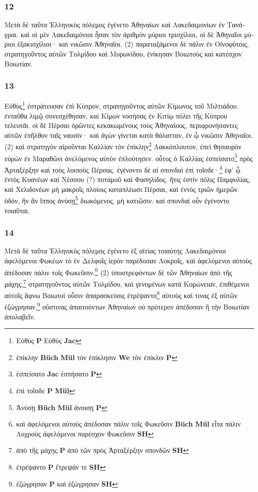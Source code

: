 \subsubsection*{12} \textgreek{Μετὰ δὲ ταῦτα Ἑλληνικὸς πόλεμος ἐγένετο Ἀθηναίων καὶ Λακεδαιμονίων ἐν Τανάγραι. καὶ οἱ μὲν Λακεδαιμόνιοι ἦσαν τὸν ἀριθμὸν μύριοι τρισχίλιοι, οἱ δὲ Ἀθηναῖοι μύριοι ἑξακισχίλιοι· καὶ νικῶσιν Ἀθηναῖοι. (2) παραταξάμενοι δὲ πάλιν ἐν Οἰνοφύτοις, στρατηγοῦντος αὐτῶν Τολμίδου καὶ Μυρωνίδου, ἐνίκησαν Βοιωτοὺς καὶ κατέσχον Βοιωτίαν.}

\subsubsection*{13} \textgreek{Εὐθὺς}\footnote{\textgreek{Εὐθὺς}  \textbf{P} \textgreek{Εὐθὺς } \textbf{Jac}} \textgreek{ἐστράτευσαν ἐπὶ Κύπρον, στρατηγοῦντος αὐτῶν Κίμωνος τοῦ Μιλτιάδου. ἐνταῦθα λιμῷ συνεσχέθησαν, καὶ Κίμων νοσήσας ἐν Κιτίῳ πόλει τῆς Κύπρου τελευτᾶι. οἱ δὲ Πέρσαι ὁρῶντες κεκακωμένους τοὺς Ἀθηναίους, περιφρονήσαντες αὐτῶν ἐπῆλθον ταῖς ναυσίν· καὶ ἀγὼν γίνεται κατὰ θάλατταν, ἐν ᾧ νικῶσιν Ἀθηναῖοι. (2) καὶ στρατηγὸν αἱροῦνται Καλλίαν τὸν ἐπίκλην}\footnote{\textgreek{ἐπίκλην}  \textbf{Büch} \textbf{Mül} \textgreek{τὸν ἐπίκλησιν}  \textbf{We} \textgreek{τὸν ἐπίκλιν}  \textbf{P}} \textgreek{Λακκόπλουτον, ἐπεὶ θησαυρὸν εὑρὼν ἐν Μαραθῶνι ἀνελόμενος αὐτὸν ἐπλούτησεν. οὗτος ὁ Καλλίας ἐσπείσατο}\footnote{\textgreek{ἐσπείσατο} \textbf{Jac} \textgreek{ἑσπήσατο}  \textbf{P}} \textgreek{πρὸς Ἀρταξέρξην καὶ τοὺς λοιποὺς Πέρσας. ἐγένοντο δὲ αἱ σπονδαὶ ἐπὶ τοῖσδε·}\footnote{\textgreek{ἐπὶ τοῖσδε}  \textbf{P} \textgreek{} \textbf{Mül}} \textgreek{ἐφ’ ᾧ ἐντὸς Κυανέων καὶ Νέσσου} (?) \textgreek{ποταμοῦ καὶ Φασηλίδος, ἥτις ἐστὶν πόλις Παμφυλίας, καὶ Χελιδονέων μὴ μακροῖς πλοίοις καταπλέωσι Πέρσαι, καὶ ἐντὸς τριῶν ἡμερῶν ὁδόν, ἣν ἂν ἵππος ἀνύσῃ}\footnote{\textgreek{Ἀνύσῃ}  \textbf{Büch} \textbf{Mül} \textgreek{ἀνοισῃ}  \textbf{P}} \textgreek{διωκόμενος, μὴ κατιῶσιν. καὶ σπονδαὶ οὖν ἐγένοντο τοιαῦται.}

\subsubsection*{14} \textgreek{Μετὰ δὲ ταῦτα Ἑλληνικὸς πόλεμος ἐγένετο ἐξ αἰτίας τοιαύτης Λακεδαιμόνιοι ἀφελόμενοι Φωκέων τὸ ἐν Δελφοῖς ἱερὸν παρέδοσαν Λοκροῖς, καὶ  ἀφελόμενοι αὐτοὺς ἀπέδοσαν πάλιν τοῖς Φωκεῦσιν.}\footnote{\textgreek{καὶ  ἀφελόμενοι αὐτοὺς ἀπέδοσαν πάλιν τοῖς Φωκεῦσιν}  \textbf{Büch} \textgreek{} \textbf{Mül} \textgreek{εἷτα πάλιν Λοχροὺς ἀφελόμενοι παρέσχον Φωκεῦσιν}  \textbf{SH}} \textgreek{(2) ὑποστρεφόντων δὲ τῶν Ἀθηναίων ἀπὸ τῆς μάχης,}\footnote{\textgreek{ἀπὸ τῆς μάχης}  \textbf{P} \textgreek{ἀπὸ τῶν πρὸς Ἀρταξέρξην 	σπονδῶν}  \textbf{SH}} \textgreek{στρατηγοῦντος αὐτῶν Τολμίδου, καὶ γενομένων κατὰ Κορώνειαν, ἐπιθέμενοι αὐτοῖς ἄφνω Βοιωτοὶ οὖσιν ἀπαρασκεύοις ἐτρέψαντο}\footnote{\textgreek{ἐτρέψαντο}  \textbf{P} \textgreek{ἔτρεψάν τε}  \textbf{SH}} \textgreek{αὐτοὺς καί τινας ἐξ αὐτῶν ἐζώγρησαν,}\footnote{\textgreek{ἐζώγρησαν}  \textbf{P} \textgreek{καὶ ἐζώγρησαν}  \textbf{SH}} \textgreek{οὕστινας ἀπαιτούντων Ἀθηναίων οὐ πρότερον ἀπέδοσαν ἢ τὴν Βοιωτίαν ἀπολαβεῖν.}

